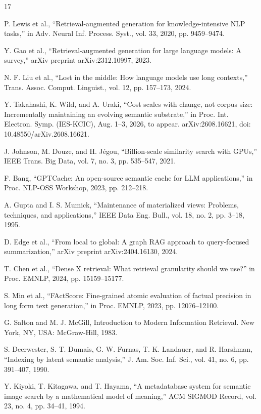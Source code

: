 \documentclass[conference,a4paper]{IEEEtran}
\begin{document}
\begin{thebibliography}{17}

 P. Lewis et al., ``Retrieval-augmented generation for knowledge-intensive NLP tasks,'' in Adv. Neural Inf. Process. Syst., vol. 33, 2020, pp. 9459--9474.

 Y. Gao et al., ``Retrieval-augmented generation for large language models: A survey,'' arXiv preprint arXiv:2312.10997, 2023.

 N. F. Liu et al., ``Lost in the middle: How language models use long contexts,'' Trans. Assoc. Comput. Linguist., vol. 12, pp. 157--173, 2024.

 Y. Takahashi, K. Wild, and A. Uraki, ``Cost scales with change, not corpus size: Incrementally maintaining an evolving semantic substrate,'' in Proc. Int. Electron. Symp. (IES-KCIC), Aug. 1--3, 2026, to appear. arXiv:2608.16621, doi: 10.48550/arXiv.2608.16621.

 J. Johnson, M. Douze, and H. Jégou, ``Billion-scale similarity search with GPUs,'' IEEE Trans. Big Data, vol. 7, no. 3, pp. 535--547, 2021.

 F. Bang, ``GPTCache: An open-source semantic cache for LLM applications,'' in Proc. NLP-OSS Workshop, 2023, pp. 212--218.

 A. Gupta and I. S. Mumick, ``Maintenance of materialized views: Problems, techniques, and applications,'' IEEE Data Eng. Bull., vol. 18, no. 2, pp. 3--18, 1995.

 D. Edge et al., ``From local to global: A graph RAG approach to query-focused summarization,'' arXiv preprint arXiv:2404.16130, 2024.

 T. Chen et al., ``Dense X retrieval: What retrieval granularity should we use?'' in Proc. EMNLP, 2024, pp. 15159--15177.

 S. Min et al., ``FActScore: Fine-grained atomic evaluation of factual precision in long form text generation,'' in Proc. EMNLP, 2023, pp. 12076--12100.

 G. Salton and M. J. McGill, Introduction to Modern Information Retrieval. New York, NY, USA: McGraw-Hill, 1983.

 S. Deerwester, S. T. Dumais, G. W. Furnas, T. K. Landauer, and R. Harshman, ``Indexing by latent semantic analysis,'' J. Am. Soc. Inf. Sci., vol. 41, no. 6, pp. 391--407, 1990.

 Y. Kiyoki, T. Kitagawa, and T. Hayama, ``A metadatabase system for semantic image search by a mathematical model of meaning,'' ACM SIGMOD Record, vol. 23, no. 4, pp. 34--41, 1994.


\end{thebibliography}
\end{document}
